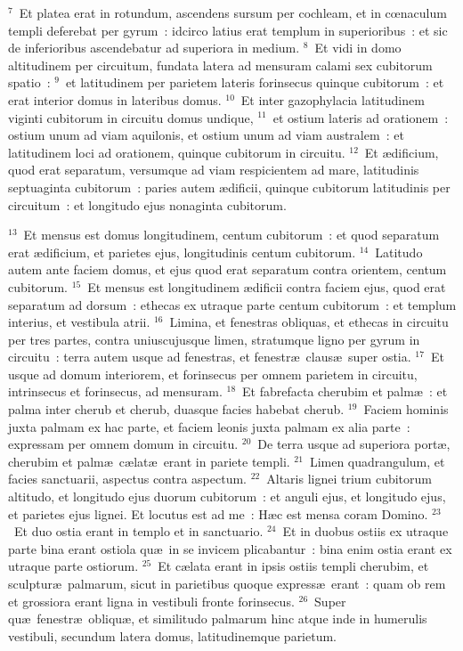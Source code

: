 ${}^{7}$~Et platea erat in rotundum, ascendens sursum per cochleam, et in cœnaculum templi deferebat per gyrum~: idcirco latius erat templum in superioribus~: et sic de inferioribus ascendebatur ad superiora in medium.
${}^{8}$~Et vidi in domo altitudinem per circuitum, fundata latera ad mensuram calami sex cubitorum spatio~:
${}^{9}$~et latitudinem per parietem lateris forinsecus quinque cubitorum~: et erat interior domus in lateribus domus.
${}^{10}$~Et inter gazophylacia latitudinem viginti cubitorum in circuitu domus undique,
${}^{11}$~et ostium lateris ad orationem~: ostium unum ad viam aquilonis, et ostium unum ad viam australem~: et latitudinem loci ad orationem, quinque cubitorum in circuitu.
${}^{12}$~Et \ae dificium, quod erat separatum, versumque ad viam respicientem ad mare, latitudinis septuaginta cubitorum~: paries autem \ae dificii, quinque cubitorum latitudinis per circuitum~: et longitudo ejus nonaginta cubitorum.


${}^{13}$~Et mensus est domus longitudinem, centum cubitorum~: et quod separatum erat \ae dificium, et parietes ejus, longitudinis centum cubitorum.
${}^{14}$~Latitudo autem ante faciem domus, et ejus quod erat separatum contra orientem, centum cubitorum.
${}^{15}$~Et mensus est longitudinem \ae dificii contra faciem ejus, quod erat separatum ad dorsum~: ethecas ex utraque parte centum cubitorum~: et templum interius, et vestibula atrii.
${}^{16}$~Limina, et fenestras obliquas, et ethecas in circuitu per tres partes, contra uniuscujusque limen, stratumque ligno per gyrum in circuitu~: terra autem usque ad fenestras, et fenestr\ae\ claus\ae\ super ostia.
${}^{17}$~Et usque ad domum interiorem, et forinsecus per omnem parietem in circuitu, intrinsecus et forinsecus, ad mensuram.
${}^{18}$~Et fabrefacta cherubim et palm\ae~: et palma inter cherub et cherub, duasque facies habebat cherub.
${}^{19}$~Faciem hominis juxta palmam ex hac parte, et faciem leonis juxta palmam ex alia parte~: expressam per omnem domum in circuitu.
${}^{20}$~De terra usque ad superiora port\ae , cherubim et palm\ae\ c\ae lat\ae\ erant in pariete templi.
${}^{21}$~Limen quadrangulum, et facies sanctuarii, aspectus contra aspectum.
${}^{22}$~Altaris lignei trium cubitorum altitudo, et longitudo ejus duorum cubitorum~: et anguli ejus, et longitudo ejus, et parietes ejus lignei. Et locutus est ad me~: H\ae c est mensa coram Domino.
${}^{23}$~Et duo ostia erant in templo et in sanctuario.
${}^{24}$~Et in duobus ostiis ex utraque parte bina erant ostiola qu\ae\ in se invicem plicabantur~: bina enim ostia erant ex utraque parte ostiorum.
${}^{25}$~Et c\ae lata erant in ipsis ostiis templi cherubim, et sculptur\ae\ palmarum, sicut in parietibus quoque express\ae\ erant~: quam ob rem et grossiora erant ligna in vestibuli fronte forinsecus.
${}^{26}$~Super qu\ae\ fenestr\ae\ obliqu\ae , et similitudo palmarum hinc atque inde in humerulis vestibuli, secundum latera domus, latitudinemque parietum.

